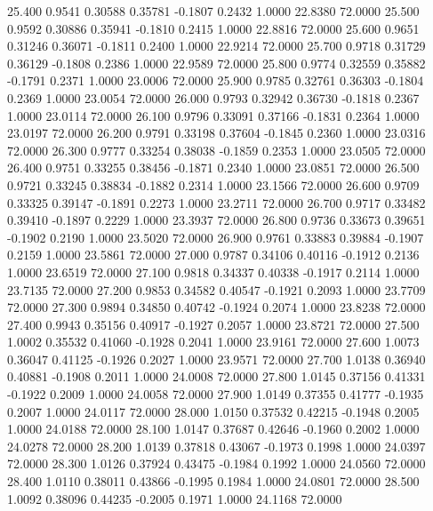  25.400   0.9541   0.30588   0.35781  -0.1807   0.2432   1.0000  22.8380  72.0000
  25.500   0.9592   0.30886   0.35941  -0.1810   0.2415   1.0000  22.8816  72.0000
  25.600   0.9651   0.31246   0.36071  -0.1811   0.2400   1.0000  22.9214  72.0000
  25.700   0.9718   0.31729   0.36129  -0.1808   0.2386   1.0000  22.9589  72.0000
  25.800   0.9774   0.32559   0.35882  -0.1791   0.2371   1.0000  23.0006  72.0000
  25.900   0.9785   0.32761   0.36303  -0.1804   0.2369   1.0000  23.0054  72.0000
  26.000   0.9793   0.32942   0.36730  -0.1818   0.2367   1.0000  23.0114  72.0000
  26.100   0.9796   0.33091   0.37166  -0.1831   0.2364   1.0000  23.0197  72.0000
  26.200   0.9791   0.33198   0.37604  -0.1845   0.2360   1.0000  23.0316  72.0000
  26.300   0.9777   0.33254   0.38038  -0.1859   0.2353   1.0000  23.0505  72.0000
  26.400   0.9751   0.33255   0.38456  -0.1871   0.2340   1.0000  23.0851  72.0000
  26.500   0.9721   0.33245   0.38834  -0.1882   0.2314   1.0000  23.1566  72.0000
  26.600   0.9709   0.33325   0.39147  -0.1891   0.2273   1.0000  23.2711  72.0000
  26.700   0.9717   0.33482   0.39410  -0.1897   0.2229   1.0000  23.3937  72.0000
  26.800   0.9736   0.33673   0.39651  -0.1902   0.2190   1.0000  23.5020  72.0000
  26.900   0.9761   0.33883   0.39884  -0.1907   0.2159   1.0000  23.5861  72.0000
  27.000   0.9787   0.34106   0.40116  -0.1912   0.2136   1.0000  23.6519  72.0000
  27.100   0.9818   0.34337   0.40338  -0.1917   0.2114   1.0000  23.7135  72.0000
  27.200   0.9853   0.34582   0.40547  -0.1921   0.2093   1.0000  23.7709  72.0000
  27.300   0.9894   0.34850   0.40742  -0.1924   0.2074   1.0000  23.8238  72.0000
  27.400   0.9943   0.35156   0.40917  -0.1927   0.2057   1.0000  23.8721  72.0000
  27.500   1.0002   0.35532   0.41060  -0.1928   0.2041   1.0000  23.9161  72.0000
  27.600   1.0073   0.36047   0.41125  -0.1926   0.2027   1.0000  23.9571  72.0000
  27.700   1.0138   0.36940   0.40881  -0.1908   0.2011   1.0000  24.0008  72.0000
  27.800   1.0145   0.37156   0.41331  -0.1922   0.2009   1.0000  24.0058  72.0000
  27.900   1.0149   0.37355   0.41777  -0.1935   0.2007   1.0000  24.0117  72.0000
  28.000   1.0150   0.37532   0.42215  -0.1948   0.2005   1.0000  24.0188  72.0000
  28.100   1.0147   0.37687   0.42646  -0.1960   0.2002   1.0000  24.0278  72.0000
  28.200   1.0139   0.37818   0.43067  -0.1973   0.1998   1.0000  24.0397  72.0000
  28.300   1.0126   0.37924   0.43475  -0.1984   0.1992   1.0000  24.0560  72.0000
  28.400   1.0110   0.38011   0.43866  -0.1995   0.1984   1.0000  24.0801  72.0000
  28.500   1.0092   0.38096   0.44235  -0.2005   0.1971   1.0000  24.1168  72.0000
